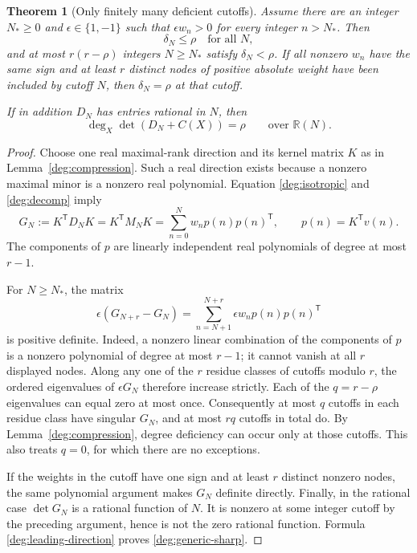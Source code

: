 \documentclass[11pt]{article}
\newtheorem{theorem}{Theorem}[section]
\theoremstyle{definition}
\theoremstyle{remark}
\numberwithin{equation}{section}
\begin{document}
\begin{theorem}[Only finitely many deficient cutoffs]
\label{deg:main}
Assume there are an integer $N_*\ge0$ and $\epsilon\in\{1,-1\}$ such
that $\epsilon w_n>0$ for every integer $n>N_*$.  Then
\[
 \delta_N\le\rho\quad\text{for all }N,
\]
and at most $r(r-\rho)$ integers $N\ge N_*$ satisfy
$\delta_N<\rho$.
If all nonzero $w_n$ have the same sign and at least $r$ distinct
nodes of positive absolute weight have been included by cutoff $N$,
then $\delta_N=\rho$ at that cutoff.

If in addition $D_N$ has entries rational in $N$, then
\begin{equation}\label{deg:generic-sharp}
 \deg_X\det(D_N+C(X))=\rho
 \qquad\text{over }\mathbb R(N).
\end{equation}
\end{theorem}
\begin{proof}
Choose one real maximal-rank direction and its kernel matrix $K$ as in
Lemma~\ref{deg:compression}.  Such a real direction exists because a
nonzero maximal minor is a nonzero real polynomial.  Equation
\eqref{deg:isotropic} and \eqref{deg:decomp} imply
\begin{equation}\label{deg:gram}
 G_N:=K^{\mathsf T}D_NK
 =K^{\mathsf T}M_NK
 =\sum_{n=0}^N w_n p(n)p(n)^{\mathsf T},
 \qquad p(n)=K^{\mathsf T}v(n).
\end{equation}
The components of $p$ are linearly independent real polynomials of
degree at most $r-1$.

For $N\ge N_*$, the matrix
\[
 \epsilon(G_{N+r}-G_N)
 =\sum_{n=N+1}^{N+r}\epsilon w_n p(n)p(n)^{\mathsf T}
\]
is positive definite.  Indeed, a nonzero linear combination of the
components of $p$ is a nonzero polynomial of degree at most $r-1$;
it cannot vanish at all $r$ displayed nodes.  Along any one of the
$r$ residue classes of cutoffs modulo $r$, the ordered eigenvalues of
$\epsilon G_N$ therefore increase strictly.  Each of the $q=r-\rho$
eigenvalues can equal zero at most once.  Consequently at most $q$
cutoffs in each residue class have singular $G_N$, and at most $rq$
cutoffs in total do.  By Lemma~\ref{deg:compression}, degree deficiency
can occur only at those cutoffs.  This also treats $q=0$, for which
there are no exceptions.

If the weights in the cutoff have one sign and at least $r$ distinct
nonzero nodes, the same polynomial argument makes $G_N$ definite
directly.  Finally, in the rational case $\det G_N$ is a rational
function of $N$.  It is nonzero at some integer cutoff by the preceding
argument, hence is not the zero rational function.  Formula
\eqref{deg:leading-direction} proves \eqref{deg:generic-sharp}.
\end{proof}
\end{document}
